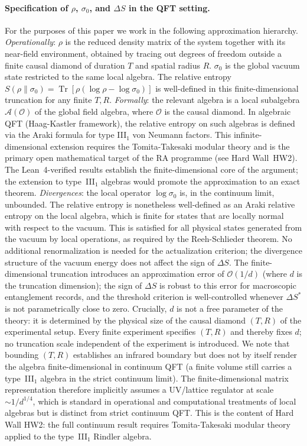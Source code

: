 \documentclass[11pt,a4paper]{article}
\theoremstyle{plain}
\theoremstyle{definition}
\theoremstyle{remark}
\begin{document}
\paragraph{Specification of $\rho$, $\sigma_0$, and $\Delta S$ in the QFT setting.}
For the purposes of this paper we work in the following approximation hierarchy.
\emph{Operationally}: $\rho$ is the reduced density matrix of the system together
with its near-field environment, obtained by tracing out degrees of freedom outside
a finite causal diamond of duration $T$ and spatial radius $R$. $\sigma_0$ is the
global vacuum state restricted to the same local algebra. The relative entropy
$S(\rho\|\sigma_0) = \operatorname{Tr}[\rho(\log\rho - \log\sigma_0)]$ is
well-defined in this finite-dimensional truncation for any finite $T, R$.
\emph{Formally}: the relevant algebra is a local subalgebra $\mathcal{A}(\mathcal{O})$
of the global field algebra, where $\mathcal{O}$ is the causal diamond. In
algebraic QFT (Haag-Kastler framework), the relative entropy on such algebras is
defined via the Araki formula for type III$_1$ von Neumann factors. This
infinite-dimensional extension requires the Tomita-Takesaki modular theory and
is the primary open mathematical target of the RA programme (see Hard
Wall~HW2). The Lean~4-verified results establish the finite-dimensional core
of the argument; the extension to type~III$_1$ algebras would promote the
approximation to an exact theorem.
\emph{Divergences}: the local operator $\log\sigma_0$ is, in the continuum
limit, unbounded. The relative entropy is nonetheless well-defined as an
Araki relative entropy on the local algebra, which is finite for states
that are locally normal with respect to the vacuum. This is satisfied for
all physical states generated from the vacuum by local operations, as
required by the Reeh-Schlieder theorem. No additional renormalization is
needed for the actualization criterion; the divergence structure of the
vacuum energy does not affect the sign of $\Delta S$.
The finite-dimensional truncation introduces an approximation error of
$\mathcal{O}(1/d)$ (where $d$ is the truncation dimension); the sign
of $\Delta S$ is robust to this error for macroscopic entanglement records,
and the threshold criterion is well-controlled whenever $\Delta S^*$
is not parametrically close to zero.
Crucially, $d$ is not a free parameter of the theory: it is determined by
the physical size of the causal diamond $(T, R)$ of the experimental setup.
Every finite experiment specifies $(T, R)$ and thereby fixes $d$;
no truncation scale independent of the experiment is introduced.
We note that bounding $(T, R)$ establishes an infrared boundary but does
not by itself render the algebra finite-dimensional in continuum QFT
(a finite volume still carries a type~III$_1$ algebra in the strict
continuum limit). The finite-dimensional matrix representation therefore
implicitly assumes a UV/lattice regulator at scale $\sim 1/d^{1/4}$,
which is standard in operational and computational treatments of local
algebras but is distinct from strict continuum QFT. This is the content
of Hard Wall HW2: the full continuum result requires Tomita-Takesaki
modular theory applied to the type~III$_1$ Rindler algebra.
\end{document}
